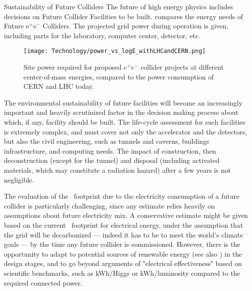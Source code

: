 \documentclass[../SustainableHEP.tex]{subfiles}
\begin{document}
\begin{casestudy}{Sustainability of Future Colliders}%
\noindent The future of high energy physics includes decisions on Future Collider Facilities to be built.  compares the energy needs of Future e$^+$e$^-$ Colliders. The projected grid power during operation is given, including parts for the laboratory, computer center, detector, etc.

\begin{figure}
    {\texttt{[image: Technology/power\_vs\_logE\_withLHCandCERN.png]}}
    \caption{Site power required for proposed $e^+e^-$ collider projects at different center-of-mass energies, compared to the power consumption of CERN and LHC today. ~\cite{privateJList} \label{fig:powerCollider}}
\end{figure}

The environmental sustainability of future facilities will become an increasingly important and heavily scrutinized factor in the decision making process about which, if any, facility should be built. The life-cycle assessment for such facilities is extremely complex, and must cover not only the accelerator and the detectors, but also the civil engineering, such as tunnels and caverns, buildings infrastructure, and computing needs. The impact of construction, then deconstruction (except for the tunnel) and disposal (including activated materials, which may constitute a radiation hazard) after a few years is not negligible.

The evaluation of the \CdO\ footprint due to the electricity consumption of a future collider is particularly challenging, since any estimate relies heavily on assumptions about future electricity mix. A conservative estimate might be given based on the current \CdO\ footprint for electrical energy, under the assumption that the grid will be decarbonized --- indeed it has to be to meet the world's climate goals --- by the time any future collider is commissioned. However, there is the opportunity to adapt to potential sources of renewable energy (see also ) in the design stages, and to go beyond arguments of "electrical effectiveness" based on scientific benchmarks, such as kWh/Higgs or kWh/luminosity compared to the required connected power.
\end{casestudy}
\end{document}
